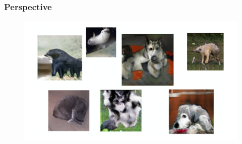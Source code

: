 \documentclass{Bredelebeamer}
\begin{document}
\begin{frame} \frametitle{Perspective}
	\begin{figure}[h!]
	\centering
	\includegraphics[width=\textwidth]{gan_perspective_problem.png}
	\end{figure}
\end{frame}
\end{document}

